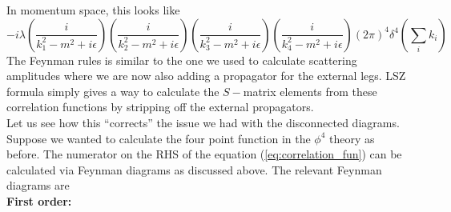 \documentclass[11pt, notitlepage]{report}
\numberwithin{equation}{section}
\begin{document}
 In momentum space, this looks like 
\begin{equation*}
    -i\lambda \left(  \frac{i}{k_1^2 - m^2 + i\epsilon}  \right)\left(  \frac{i}{k_2^2 - m^2 + i\epsilon}  \right)\left(  \frac{i}{k_3^2 - m^2 + i\epsilon}  \right)\left(  \frac{i}{k_4^2 - m^2 + i\epsilon}  \right) (2\pi)^4 \delta^4\left(\sum_i k_i \right)
\end{equation*}
The Feynman rules is similar to the one we used to calculate scattering amplitudes where we are now also adding a propagator for the external legs. LSZ formula simply gives a way to calculate the \(S-\)matrix elements from these correlation functions by stripping off the external propagators.\\

Let us see how this ``corrects'' the issue we had with the disconnected diagrams. Suppose we wanted to calculate the four point function in the \(\phi^4\) theory as before. The numerator on the RHS of the equation (\ref{eq:correlation_fun}) can be calculated via Feynman diagrams as discussed above. The relevant Feynman diagrams are \\

\textbf{First order: }
\begin{figure}[h]
    \centering
\end{figure}
\end{document}
